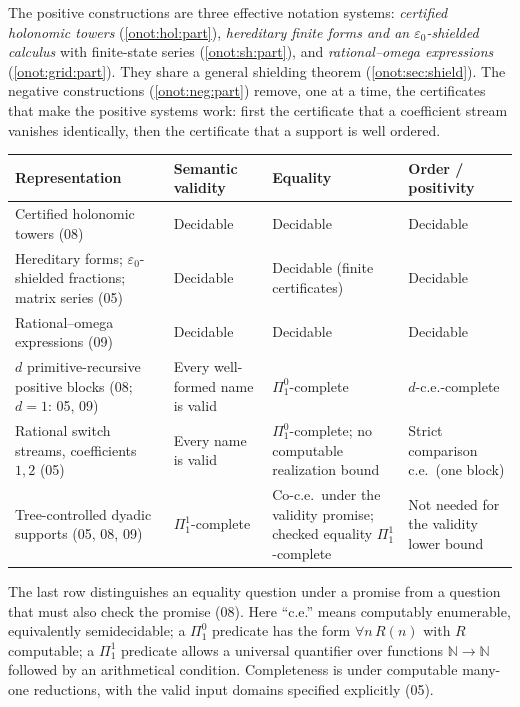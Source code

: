 \documentclass[11pt,oneside]{article}
\numberwithin{equation}{section}
\theoremstyle{definition}
\theoremstyle{remark}
\newcommand{\N}{\mathbb N}
\begin{document}
The positive constructions are three effective notation systems:
\emph{certified holonomic towers} (\cref{onot:hol:part}), \emph{hereditary finite
forms and an $\varepsilon_0$-shielded calculus} with finite-state series
(\cref{onot:sh:part}), and \emph{rational--omega expressions}
(\cref{onot:grid:part}). They share a general shielding theorem
(\cref{onot:sec:shield}). The negative constructions (\cref{onot:neg:part})
remove, one at a time, the certificates that make the positive systems work:
first the certificate that a coefficient stream vanishes identically, then the
certificate that a support is well ordered.

\begin{center}\small
\renewcommand{\arraystretch}{1.2}
\begin{tabular}{@{}P{.27\textwidth}P{.2\textwidth}P{.21\textwidth}P{.22\textwidth}@{}}
\toprule
Representation & Semantic validity & Equality & Order / positivity\\
\midrule
Certified holonomic towers (08) & Decidable & Decidable & Decidable\\
Hereditary forms; $\varepsilon_0$-shielded fractions; matrix series (05) &
Decidable & Decidable (finite certificates) & Decidable\\
Rational--omega expressions (09) & Decidable & Decidable & Decidable\\
$d$ primitive-recursive positive blocks (08; $d=1$: 05, 09) & Every
well-formed name is valid & $\Pi^0_1$-complete & $d$-c.e.-complete\\
Rational switch streams, coefficients $1,2$ (05) & Every name is valid &
$\Pi^0_1$-complete; no computable realization bound & Strict comparison c.e.\
(one block)\\
Tree-controlled dyadic supports (05, 08, 09) & $\Pi^1_1$-complete & Co-c.e.\
under the validity promise; checked equality $\Pi^1_1$-complete & Not needed for
the validity lower bound\\
\bottomrule
\end{tabular}
\end{center}
The last row distinguishes an equality question under a promise from a
question that must also check the promise (08). Here ``c.e.'' means
computably enumerable, equivalently semidecidable; a $\Pi^0_1$ predicate has the
form $\forall n\,R(n)$ with $R$ computable; a $\Pi^1_1$ predicate allows a
universal quantifier over functions $\N\to\N$ followed by an arithmetical
condition. Completeness is under computable many-one reductions, with the valid
input domains specified explicitly (05).
\end{document}
